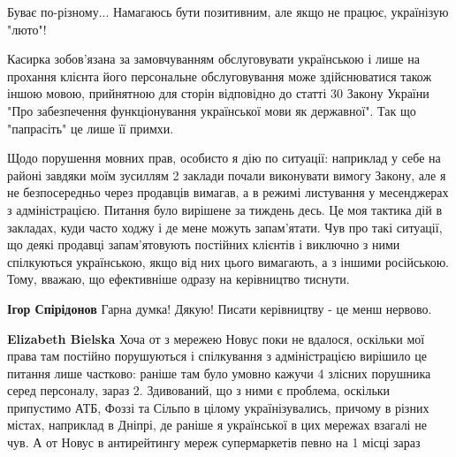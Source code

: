\begin{itemize}
 

Буває по-різному... Намагаюсь бути позитивним, але якщо не працює, українізую
"люто"!

 

Касирка зобов'язана за замовчуванням обслуговувати українською і лише на
прохання клієнта його персональне обслуговування може здійснюватися також іншою
мовою, прийнятною для сторін відповідно до статті 30 Закону України "Про
забезпечення функціонування української мови як державної". Так що "папрасіть"
це лише її примхи.

Щодо порушення мовних прав, особисто я дію по ситуації: наприклад у себе на
районі завдяки моїм зусиллям 2 заклади почали виконувати вимогу Закону, але я
не безпосередньо через продавців вимагав, а в режимі листування у месенджерах з
адміністрацією. Питання було вирішене за тиждень десь. Це моя тактика дій в
закладах, куди часто ходжу і де мене можуть запам'ятати. Чув про такі ситуації,
що деякі продавці запам'ятовують постійних клієнтів і виключно з ними
спілкуються українською, якщо від них цього вимагають, а з іншими російською.
Тому, вважаю, що ефективніше одразу на керівництво тиснути.

\begin{itemize}
 
\textbf{Ігор Спірідонов} Гарна думка! Дякую! Писати керівництву - це менш нервово.

 
\textbf{Elizabeth Bielska} Хоча от з мережею Новус поки не вдалося, оскільки
мої права там постійно порушуються і спілкування з адміністрацією вирішило це
питання лише частково: раніше там було умовно кажучи 4 злісних порушника серед
персоналу, зараз 2. Здивований, що з ними є проблема, оскільки припустимо АТБ,
Фоззі та Сільпо в цілому українізувались, причому в різних містах, наприклад в
Дніпрі, де раніше я української в цих мережах взагалі не чув. А от Новус в
антирейтингу мереж супермаркетів певно на 1 місці зараз
\end{itemize}


\end{itemize}
